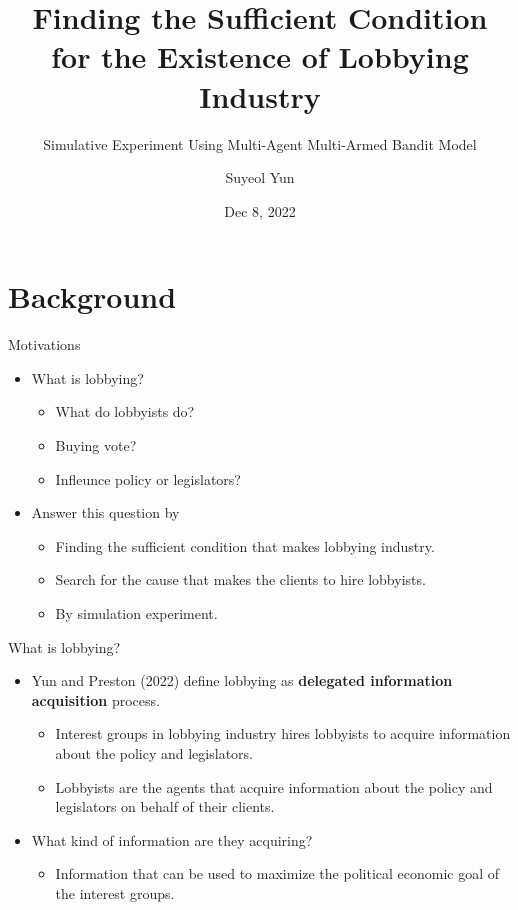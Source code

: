 \documentclass{beamer}
\begin{document}
	\title[]{Finding the Sufficient Condition for the Existence of Lobbying Industry}
	\subtitle{Simulative Experiment Using Multi-Agent Multi-Armed Bandit Model}
	\author[Suyeol Yun]{Suyeol Yun}
	\date{Dec 8, 2022}
	\frame{\titlepage}
	\section{Background}

	\begin{frame}{Motivations}
		\begin{itemize}
			\item What is lobbying?
			\begin{itemize}
				\item What do lobbyists do?
				\item Buying vote? 
				\item Infleunce policy or legislators?
			\end{itemize}
		\end{itemize}
		\begin{itemize}
			\item Answer this question by
			\begin{itemize}
				\item Finding the sufficient condition that makes lobbying industry. 
				\item Search for the cause that makes the clients to hire lobbyists.
				\item By simulation experiment.				
			\end{itemize}
		\end{itemize}
	\end{frame}

	\begin{frame}{What is lobbying?}
		\begin{itemize}
			\item Yun and Preston (2022) define lobbying as \textbf{delegated information acquisition} process.
			\begin{itemize}
				\item Interest groups in lobbying industry hires lobbyists to acquire information about the policy and legislators.
				\item Lobbyists are the agents that acquire information about the policy and legislators on behalf of their clients.		
			\end{itemize}
			\item What kind of information are they acquiring?
			\begin{itemize}
				\item Information that can be used to maximize the political economic goal of the interest groups.
			\end{itemize}
		\end{itemize}
	\end{frame}
\end{document}
